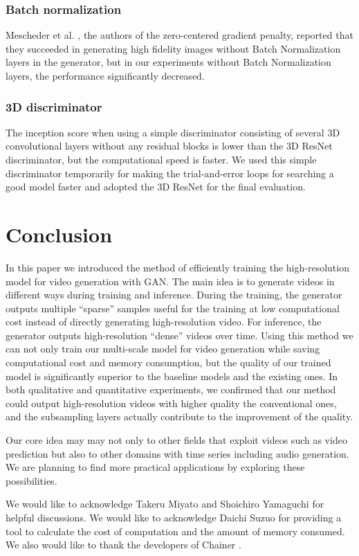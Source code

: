 \documentclass[twocolumn]{svjour3}
\begin{document}
\subsubsection{Batch normalization}
Mescheder et al. \cite{Mescheder2018}, the authors of the zero-centered gradient penalty, reported that they succeeded in generating high fidelity images without Batch Normalization layers in the generator, but in our experiments without Batch Normalization layers, the performance significantly decreased.

\subsubsection{3D discriminator}
The inception score when using a simple discriminator consisting of several 3D convolutional layers without any residual blocks is lower than the 3D ResNet discriminator, but the computational speed is faster. We used this simple discriminator temporarily for making the trial-and-error loops for searching a good model faster and adopted the 3D ResNet for the final evaluation.

\section{Conclusion}
In this paper we introduced the method of efficiently training the high-resolution model for video generation with GAN.
The main idea is to generate videos in different ways during training and inference.
During the training, the generator outputs multiple ``sparse'' samples
useful for the training at low computational cost
instead of directly generating high-resolution video.
For inference, the generator outputs high-resolution ``dense'' videos over time.
Using this method we can not only train our multi-scale model for video generation
while saving computational cost and memory consumption,
but the quality of our trained model is significantly superior to
the baseline models and the existing ones.
In both qualitative and quantitative experiments, we confirmed that
our method could output high-resolution videos with higher quality the conventional ones,
and the subsampling layers actually contribute to the improvement of the quality.

Our core idea may may not only to other fields that exploit videos
such as video prediction but also to other domains with time series
including audio generation.
We are planning to find more practical applications by exploring these possibilities.

\begin{acknowledgements}
We would like to acknowledge Takeru Miyato and Shoichiro Yamaguchi for helpful discussions.
We would like to acknowledge Daichi Suzuo for providing a tool to calculate the cost of computation and the amount of memory consumed.
We also would like to thank the developers of Chainer \cite{Tokui2015,Akiba2017}.
\end{acknowledgements}

      

   
\end{document}
